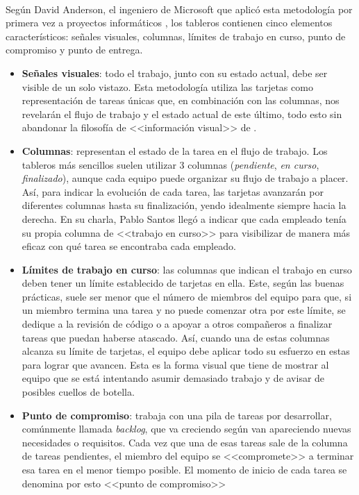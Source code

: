\documentclass{subfiles}
\begin{document}
        \paragraph{}
        {Según David Anderson, el ingeniero de Microsoft que aplicó esta metodología por primera vez a proyectos informáticos \cite{book:anderson_david_kanban}, los tableros \Kanban contienen cinco elementos característicos: señales visuales, columnas, límites de trabajo en curso, punto de compromiso y punto de entrega.}

        \begin{itemize}
            \item {\textbf{Señales visuales}: todo el trabajo, junto con su estado actual, debe ser visible de un solo vistazo. Esta metodología utiliza las tarjetas como representación de tareas únicas que, en combinación con las columnas, nos revelarán el flujo de trabajo y el estado actual de este último, todo esto sin abandonar la filosofía de <<información visual>> de \Kanban.}
            \item {\textbf{Columnas}: representan el estado de la tarea en el flujo de trabajo. Los tableros más sencillos suelen utilizar 3 columnas (\textit{pendiente}, \textit{en curso}, \textit{finalizado}), aunque cada equipo puede organizar su flujo de trabajo a placer. Así, para indicar la evolución de cada tarea, las tarjetas avanzarán por diferentes columnas hasta su finalización, yendo idealmente siempre hacia la derecha. En su charla, Pablo Santos llegó a indicar que cada empleado tenía su propia columna de <<trabajo en curso>> para visibilizar de manera más eficaz con qué tarea se encontraba cada empleado.}
            \item {\textbf{Límites de trabajo en curso}: las columnas que indican el trabajo en curso deben tener un límite establecido de tarjetas en ella. Este, según las buenas prácticas, suele ser menor que el número de miembros del equipo para que, si un miembro termina una tarea y no puede comenzar otra por este límite, se dedique a la revisión de código o a apoyar a otros compañeros a finalizar tareas que puedan haberse atascado. Así, cuando una de estas columnas alcanza su límite de tarjetas, el equipo debe aplicar todo su esfuerzo en estas para lograr que avancen. Esta es la forma visual que tiene \Kanban de mostrar al equipo que se está intentando asumir demasiado trabajo y de avisar de posibles cuellos de botella.}
            \item {\textbf{Punto de compromiso}: \Kanban trabaja con una pila de tareas por desarrollar, comúnmente llamada \textit{backlog}, que va creciendo según van apareciendo nuevas necesidades o requisitos. Cada vez que una de esas tareas sale de la columna de tareas pendientes, el miembro del equipo se <<compromete>> a terminar esa tarea en el menor tiempo posible. El momento de inicio de cada tarea se denomina por esto <<punto de compromiso>>}

\end{itemize}
\end{document}

